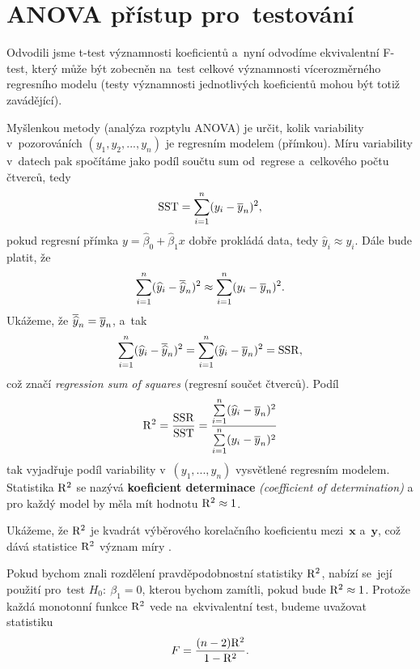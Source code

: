 \section{ANOVA přístup pro~testování}
Odvodili jsme t-test významnosti koeficientů a~nyní odvodíme ekvivalentní F-test, který může být zobecněn na~test celkové významnosti vícerozměrného regresního modelu (testy významnosti jednotlivých koeficientů mohou být totiž zavádějící).

Myšlenkou metody (analýza rozptylu ANOVA) je určit, kolik variability v~pozorováních $(y_1,y_2,...,y_n)$ je  regresním modelem (přímkou). Míru variability v~datech pak spočítáme jako podíl součtu sum od~regrese a~celkového počtu čtverců, tedy
 $$ \mathrm{SST} = \sum\limits_{i=1}^{n}(y_i-\overline{y}_n)^2, $$
pokud regresní přímka $y = \widehat{\beta}_0+\widehat{\beta}_1 x$ dobře prokládá data, tedy $\widehat{y}_i\approx y_i$. Dále bude platit, že
 $$ \sum\limits_{i=1}^{n} (\widehat{y}_i-\overline{\widehat{y}}_n)^2\approx\sum\limits_{i=1}^{n} (y_i-\overline{y}_n)^2. $$
Ukážeme, že $\overline{\widehat{y}}_n = \overline{y}_n$, a~tak
 $$ \sum\limits_{i=1}^{n} (\widehat{y}_i-\overline{\widehat{y}}_n)^2 = \sum\limits_{i=1}^{n} (\widehat{y}_i-\overline{y}_n)^2 = \mathrm{SSR}, $$ což značí \textit{regression sum of squares} (regresní součet čtverců). Podíl
 $$ \mathrm{R}^2 = \frac{\mathrm{SSR}}{\mathrm{SST}} = \frac{\sum\limits_{i=1}^{n} (\widehat{y}_i-\overline{y}_n)^2}{\sum\limits_{i=1}^{n} (y_i-\overline{y}_n)^2} $$ tak vyjadřuje podíl variability v~$(y_1,...,y_n)$ vysvětlené regresním modelem. Statistika $\mathrm{R}^2$ se nazývá \textbf{koeficient determinace} \textit{(coefficient of determination)} a pro každý model by měla mít hodnotu $\mathrm{R}^2\approx 1$.

Ukážeme, že $\mathrm{R}^2$ je kvadrát výběrového korelačního koeficientu mezi~$\textbf{x}$ a~$\textbf{y}$, což dává statistice $\mathrm{R}^2$ význam míry .

Pokud bychom znali rozdělení pravděpodobnostní statistiky $\mathrm{R}^2$, nabízí se~její použití pro~test $H_0:~\beta_1 = 0$, kterou bychom zamítli, pokud bude $\mathrm{R}^2\approx1$. Protože každá monotonní funkce $\mathrm{R}^2$ vede na~ekvivalentní test, budeme uvažovat statistiku 
\begin{equation}
	F = \frac{(n-2)\mathrm{R}^2}{1-\mathrm{R}^2}. \label{Definice F}
	\end{equation}

